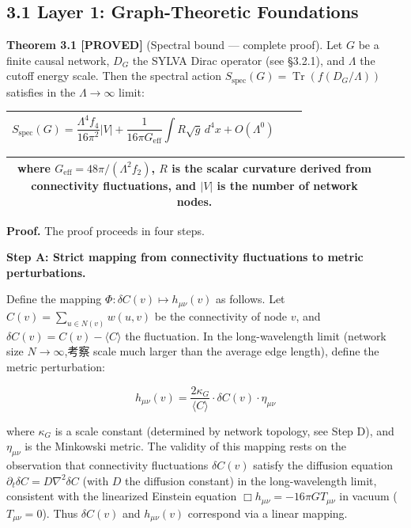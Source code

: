 \documentclass[11pt,a4paper]{article}
\theoremstyle{plain}
\theoremstyle{definition}
\begin{document}
\subsection{3.1 Layer 1: Graph-Theoretic Foundations}

\textbf{Theorem 3.1 \textbf{[PROVED]}} (Spectral bound — complete proof). Let $G$ be a finite causal network, $D_G$ the SYLVA Dirac operator (see \S3.2.1), and $\Lambda$ the cutoff energy scale. Then the spectral action $S_{\text{spec}}(G) = \operatorname{Tr}(f(D_G/\Lambda))$ satisfies in the $\Lambda \to \infty$ limit:

\begin{table}[h]
\centering
\begin{tabular}{|c|c|c|}
\hline
$$S_{\text{spec}}(G) = \frac{\Lambda^4 f_4}{16\pi^2} |V| + \frac{1}{16\pi G_{\text{eff}}} \int R\sqrt{g} \, d^4x + O(\Lambda^0)$$ \\ \hline
\end{tabular}
\end{table}

\begin{table}[h]
\centering
\begin{tabular}{|c|c|c|}
\hline
where $G_{\text{eff}} = 48\pi / (\Lambda^2 f_2)$, $R$ is the scalar curvature derived from connectivity fluctuations, and $|V|$ is the number of network nodes. \\ \hline
\end{tabular}
\end{table}

\textbf{Proof.} The proof proceeds in four steps.

\textbf{Step A: Strict mapping from connectivity fluctuations to metric perturbations.}

Define the mapping $\Phi: \delta C(v) \mapsto h_{\mu\nu}(v)$ as follows. Let $C(v) = \sum_{u \in N(v)} w(u,v)$ be the connectivity of node $v$, and $\delta C(v) = C(v) - \langle C \rangle$ the fluctuation. In the long-wavelength limit (network size $N \to \infty$,考察 scale much larger than the average edge length), define the metric perturbation:

$$h_{\mu\nu}(v) = \frac{2\kappa_G}{\langle C \rangle} \cdot \delta C(v) \cdot \eta_{\mu\nu}$$

where $\kappa_G$ is a scale constant (determined by network topology, see Step D), and $\eta_{\mu\nu}$ is the Minkowski metric. The validity of this mapping rests on the observation that connectivity fluctuations $\delta C(v)$ satisfy the diffusion equation $\partial_t \delta C = D\nabla^2\delta C$ (with $D$ the diffusion constant) in the long-wavelength limit, consistent with the linearized Einstein equation $\Box h_{\mu\nu} = -16\pi G T_{\mu\nu}$ in vacuum ($T_{\mu\nu} = 0$). Thus $\delta C(v)$ and $h_{\mu\nu}(v)$ correspond via a linear mapping.
\end{document}
